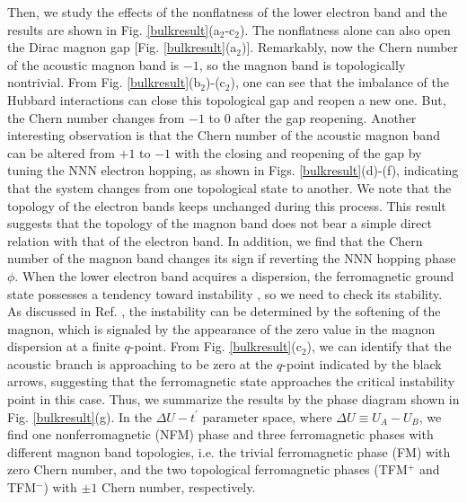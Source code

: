 \documentclass[amsmath,superscriptaddress,showpacs,aps,prl,twocolumn]{revtex4-1}
\begin{document}
\par Then, we study the effects of the nonflatness of the lower electron band and the results are shown in Fig. \ref{bulkresult}(a$_2$-c$_2$). The nonflatness alone can also open the Dirac magnon gap [Fig. \ref{bulkresult}(a$_2$)]. Remarkably, now the Chern number of the acoustic magnon band is $-1$, so the magnon band is topologically nontrivial. From Fig. \ref{bulkresult}(b$_2$)-(c$_2$), one can see that the imbalance of the Hubbard interactions can close this topological gap and reopen a new one. But, the Chern number changes from $-1$ to 0 after the gap reopening. Another interesting observation is that the Chern number of the acoustic magnon band can be altered from $+1$ to $-1$ with the closing and reopening of the gap by tuning the NNN electron hopping, as shown in Figs. \ref{bulkresult}(d)-(f), indicating that the system changes from one topological state to another. We note that the topology of the electron bands keeps unchanged during this process. This result suggests that the topology of the magnon band does not bear a simple direct relation with that of the electron band. In addition, we find that the Chern number of the magnon band changes its sign if reverting the NNN hopping phase $\phi$. When the lower electron band acquires a dispersion, the ferromagnetic ground state possesses a tendency toward instability \cite{Tasaki_PRL1994,Su_PRB2019}, so we need to check its stability. As discussed in Ref. \cite{Su_PRB2019}, the instability can be determined by the softening of the magnon, which is signaled by the appearance of the zero value in the magnon dispersion at a finite $q$-point. From Fig. \ref{bulkresult}(c$_2$), we can identify that the acoustic branch is approaching to be zero at the $q$-point indicated by the black arrows, suggesting that the ferromagnetic state approaches the critical instability point in this case. Thus, we summarize the results by the phase diagram shown in Fig. \ref{bulkresult}(g). In the $\Delta U-t^\prime$ parameter space, where $\Delta U\equiv U_A-U_B$, we find one nonferromagnetic (NFM) phase and three ferromagnetic phases with different magnon band topologies, i.e. the trivial ferromagnetic phase (FM) with zero Chern number, and the two topological ferromagnetic phases (TFM$^+$ and TFM$^-$) with $\pm1$ Chern number, respectively.
\end{document}

